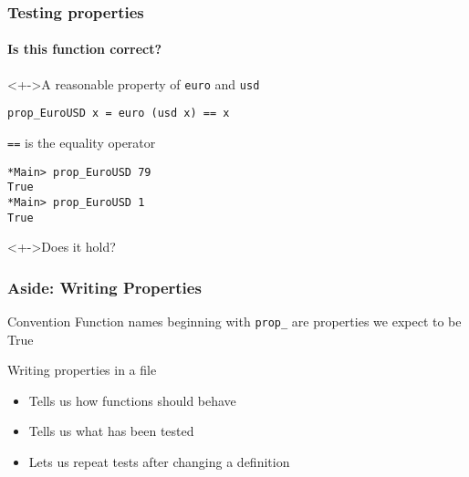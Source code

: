 \documentclass{beamer}
\begin{document}
\begin{frame}[fragile]
  \frametitle{Testing properties}
  \framesubtitle{Is this function correct?}
  \begin{block}<+->{A reasonable property of \texttt{euro} and \texttt{usd}}
\begin{verbatim}
prop_EuroUSD x = euro (usd x) == x
\end{verbatim}
    \texttt{==} is the equality operator
\begin{verbatim}
*Main> prop_EuroUSD 79
True
*Main> prop_EuroUSD 1
True
\end{verbatim}
  \end{block}
  \begin{alertblock}<+->{Does it hold?}
    
  \end{alertblock}
\end{frame}
\begin{frame}[fragile]
  \frametitle{Aside: Writing Properties}
  \begin{block}{Convention}
    Function names beginning with
    \verb|prop_| are properties we expect to be True 
  \end{block}
  \begin{block}{Writing properties in a file}
    \begin{itemize}
    \item Tells us how functions should behave 
    \item Tells us what has been tested 
    \item Lets us repeat tests after changing a definition 
    \end{itemize}
  \end{block}
\end{frame}
\end{document}
